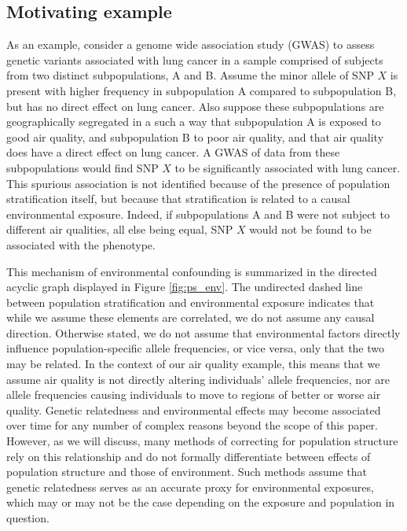 \subsection{Motivating example}

As an example, consider a genome wide association study (GWAS) to assess genetic variants associated with lung cancer in a sample comprised of subjects from two distinct subpopulations, A and B. Assume the minor allele of SNP $X$ is present with higher frequency in subpopulation A compared to subpopulation B, but has no direct effect on lung cancer. Also suppose these subpopulations are geographically segregated in a such a way that subpopulation A is exposed to good air quality, and subpopulation B to poor air quality, and that air quality does have a direct effect on lung cancer. A GWAS of data from these subpopulations would find SNP $X$ to be significantly associated with lung cancer. This spurious association is not identified because of the presence of population stratification itself, but because that stratification is related to a causal environmental exposure. Indeed, if subpopulations A and B were not subject to different air qualities, all else being equal, SNP $X$ would not be found to be associated with the phenotype.


This mechanism of environmental confounding is summarized in the directed acyclic graph displayed in Figure \ref{fig:ps_env}. The undirected dashed line between population stratification and environmental exposure indicates that while we assume these elements are correlated, we do not assume any causal direction. Otherwise stated, we do not assume that environmental factors directly influence population-specific allele frequencies, or vice versa, only that the two may be related. In the context of our air quality example, this means that we assume air quality is not directly altering individuals' allele frequencies, nor are allele frequencies causing individuals to move to regions of better or worse air quality. Genetic relatedness and environmental effects may become associated over time for any number of complex reasons beyond the scope of this paper. However, as we will discuss, many methods of correcting for population structure rely on this relationship and do not formally differentiate between effects of population structure and those of environment. Such methods assume that genetic relatedness serves as an accurate proxy for environmental exposures, which may or may not be the case depending on the exposure and population in question.  

